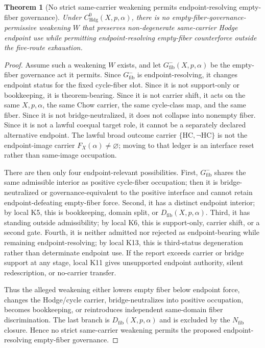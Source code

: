 \documentclass[11pt]{article}
\newtheorem{theorem}{Theorem}[section]
\newcommand{\Hdg}{\operatorname{Hdg}}
\begin{document}
\begin{theorem}[No strict same-carrier weakening permits endpoint-resolving empty-fiber governance]
Under $C^0_{\Hdg}(X,p,\alpha)$, there is no empty-fiber-governance-permissive weakening $W$ that preserves non-degenerate same-carrier Hodge endpoint use while permitting endpoint-resolving empty-fiber counterforce outside the five-route exhaustion.
\end{theorem}
\begin{proof}
Assume such a weakening $W$ exists, and let $G^-_{\mathrm{fib}}(X,p,\alpha)$ be the empty-fiber governance act it permits.  Since $G^-_{\mathrm{fib}}$ is endpoint-resolving, it changes endpoint status for the fixed cycle-fiber slot.  Since it is not support-only or bookkeeping, it is theorem-bearing.  Since it is not carrier shift, it acts on the same $X,p,\alpha$, the same Chow carrier, the same cycle-class map, and the same fiber.  Since it is not bridge-neutralized, it does not collapse into nonempty fiber.  Since it is not a lawful coequal target role, it cannot be a separately declared alternative endpoint.  The lawful broad outcome carrier $\{\mathrm{HC},\neg\mathrm{HC}\}$ is not the endpoint-image carrier $F_X(\alpha)\neq\varnothing$; moving to that ledger is an interface reset rather than same-image occupation.

There are then only four endpoint-relevant possibilities.  First, $G^-_{\mathrm{fib}}$ shares the same admissible interior as positive cycle-fiber occupation; then it is bridge-neutralized or governance-equivalent to the positive interface and cannot retain endpoint-defeating empty-fiber force.  Second, it has a distinct endpoint interior; by local K5, this is bookkeeping, domain split, or $D_{\mathrm{fib}}(X,p,\alpha)$.  Third, it has standing outside admissibility; by local K6, this is support-only, carrier shift, or a second gate.  Fourth, it is neither admitted nor rejected as endpoint-bearing while remaining endpoint-resolving; by local K13, this is third-status degeneration rather than determinate endpoint use.  If the report exceeds carrier or bridge support at any stage, local K11 gives unsupported endpoint authority, silent redescription, or no-carrier transfer.

Thus the alleged weakening either lowers empty fiber below endpoint force, changes the Hodge/cycle carrier, bridge-neutralizes into positive occupation, becomes bookkeeping, or reintroduces independent same-domain fiber discrimination.  The last branch is $D_{\mathrm{fib}}(X,p,\alpha)$ and is excluded by the $N_{\mathrm{fib}}$ closure.  Hence no strict same-carrier weakening permits the proposed endpoint-resolving empty-fiber governance.
\end{proof}
\end{document}
